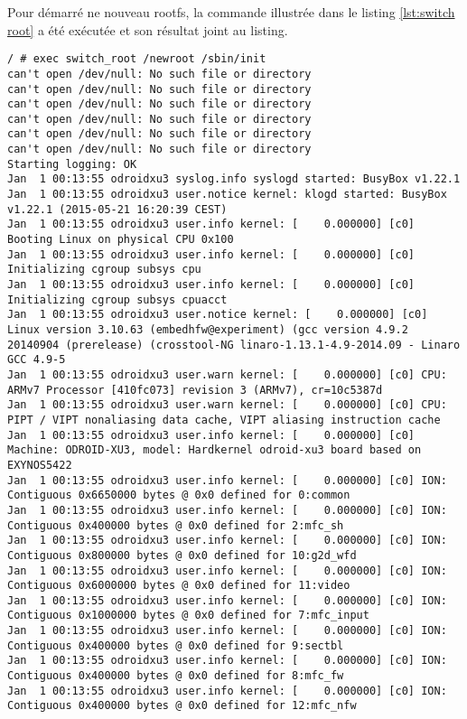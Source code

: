 Pour démarré ne nouveau rootfs, la commande illustrée dans le listing \ref{lst:switch root} a été exécutée et son résultat joint au listing.
\begin{lstlisting}[label={lst:switch root},caption=Changement de root file system]
/ # exec switch_root /newroot /sbin/init
can't open /dev/null: No such file or directory
can't open /dev/null: No such file or directory
can't open /dev/null: No such file or directory
can't open /dev/null: No such file or directory
can't open /dev/null: No such file or directory
can't open /dev/null: No such file or directory
Starting logging: OK
Jan  1 00:13:55 odroidxu3 syslog.info syslogd started: BusyBox v1.22.1
Jan  1 00:13:55 odroidxu3 user.notice kernel: klogd started: BusyBox v1.22.1 (2015-05-21 16:20:39 CEST)
Jan  1 00:13:55 odroidxu3 user.info kernel: [    0.000000] [c0] Booting Linux on physical CPU 0x100
Jan  1 00:13:55 odroidxu3 user.info kernel: [    0.000000] [c0] Initializing cgroup subsys cpu
Jan  1 00:13:55 odroidxu3 user.info kernel: [    0.000000] [c0] Initializing cgroup subsys cpuacct
Jan  1 00:13:55 odroidxu3 user.notice kernel: [    0.000000] [c0] Linux version 3.10.63 (embedhfw@experiment) (gcc version 4.9.2 20140904 (prerelease) (crosstool-NG linaro-1.13.1-4.9-2014.09 - Linaro GCC 4.9-5
Jan  1 00:13:55 odroidxu3 user.warn kernel: [    0.000000] [c0] CPU: ARMv7 Processor [410fc073] revision 3 (ARMv7), cr=10c5387d
Jan  1 00:13:55 odroidxu3 user.warn kernel: [    0.000000] [c0] CPU: PIPT / VIPT nonaliasing data cache, VIPT aliasing instruction cache
Jan  1 00:13:55 odroidxu3 user.info kernel: [    0.000000] [c0] Machine: ODROID-XU3, model: Hardkernel odroid-xu3 board based on EXYNOS5422
Jan  1 00:13:55 odroidxu3 user.info kernel: [    0.000000] [c0] ION: Contiguous 0x6650000 bytes @ 0x0 defined for 0:common
Jan  1 00:13:55 odroidxu3 user.info kernel: [    0.000000] [c0] ION: Contiguous 0x400000 bytes @ 0x0 defined for 2:mfc_sh
Jan  1 00:13:55 odroidxu3 user.info kernel: [    0.000000] [c0] ION: Contiguous 0x800000 bytes @ 0x0 defined for 10:g2d_wfd
Jan  1 00:13:55 odroidxu3 user.info kernel: [    0.000000] [c0] ION: Contiguous 0x6000000 bytes @ 0x0 defined for 11:video
Jan  1 00:13:55 odroidxu3 user.info kernel: [    0.000000] [c0] ION: Contiguous 0x1000000 bytes @ 0x0 defined for 7:mfc_input
Jan  1 00:13:55 odroidxu3 user.info kernel: [    0.000000] [c0] ION: Contiguous 0x400000 bytes @ 0x0 defined for 9:sectbl
Jan  1 00:13:55 odroidxu3 user.info kernel: [    0.000000] [c0] ION: Contiguous 0x400000 bytes @ 0x0 defined for 8:mfc_fw
Jan  1 00:13:55 odroidxu3 user.info kernel: [    0.000000] [c0] ION: Contiguous 0x400000 bytes @ 0x0 defined for 12:mfc_nfw

\end{lstlisting}
